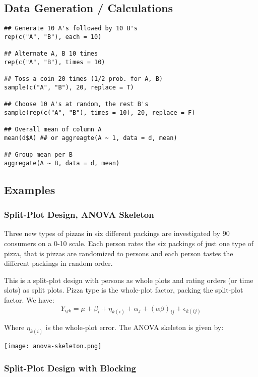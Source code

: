\subsection{Data Generation / Calculations}
\begin{lstlisting}
## Generate 10 A's followed by 10 B's
rep(c("A", "B"), each = 10)

## Alternate A, B 10 times
rep(c("A", "B"), times = 10)

## Toss a coin 20 times (1/2 prob. for A, B)
sample(c("A", "B"), 20, replace = T)

## Choose 10 A's at random, the rest B's
sample(rep(c("A", "B"), times = 10), 20, replace = F)

## Overall mean of column A
mean(d$A) ## or aggreagte(A ~ 1, data = d, mean)

## Group mean per B
aggregate(A ~ B, data = d, mean)
\end{lstlisting}


\subsection{Examples}

\subsubsection{Split-Plot Design, ANOVA Skeleton}

Three new types of pizzas in six different packings are investigated by 90 consumers on a 0-10 scale. Each person rates the six packings of just one type of pizza, that is pizzas are randomized to persons and each person tastes the different packings in random order. \medskip

This is a split-plot design with persons as whole plots and rating orders (or time slots) as split plots. Pizza type is the whole-plot factor, packing the split-plot factor. We have:
$$Y_{ijk} = \mu + \beta_i + \eta_{k(i)} + \alpha_j + (\alpha \beta)_{ij} + \epsilon_{k(ij)}$$

Where $\eta_{k(i)}$ is the whole-plot error. The ANOVA skeleton is given by:
\begin{center}
	\texttt{[image: anova-skeleton.png]}
\end{center}

\subsubsection{Split-Plot Design with Blocking}

